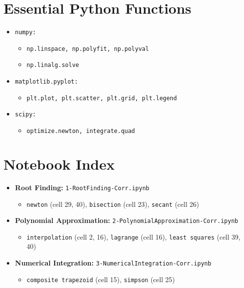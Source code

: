 \documentclass[11pt]{article}
\begin{document}
\section*{Essential Python Functions}
\begin{multicols}{2}
\begin{itemize}[leftmargin=*]
  \item \texttt{numpy:}
  \begin{itemize}
    \item \texttt{np.linspace, np.polyfit, np.polyval}
    \item \texttt{np.linalg.solve}
  \end{itemize}
  \item \texttt{matplotlib.pyplot:}
  \begin{itemize}
    \item \texttt{plt.plot, plt.scatter, plt.grid, plt.legend}
  \end{itemize}
  \item \texttt{scipy:}
  \begin{itemize}
    \item \texttt{optimize.newton, integrate.quad}
  \end{itemize}
\end{itemize}
\end{multicols}

\section*{Notebook Index}
\begin{itemize}
  \item \textbf{Root Finding:} \texttt{1-RootFinding-Corr.ipynb}
  \begin{itemize}
    \item \texttt{newton} (cell 29, 40), \texttt{bisection} (cell 23), \texttt{secant} (cell 26)
  \end{itemize}
  \item \textbf{Polynomial Approximation:} \texttt{2-PolynomialApproximation-Corr.ipynb}
  \begin{itemize}
    \item \texttt{interpolation} (cell 2, 16), \texttt{lagrange} (cell 16), \texttt{least squares} (cell 39, 40)
  \end{itemize}
  \item \textbf{Numerical Integration:} \texttt{3-NumericalIntegration-Corr.ipynb}
  \begin{itemize}
    \item \texttt{composite trapezoid} (cell 15), \texttt{simpson} (cell 25)
  \end{itemize}
\end{itemize}
\end{document}

